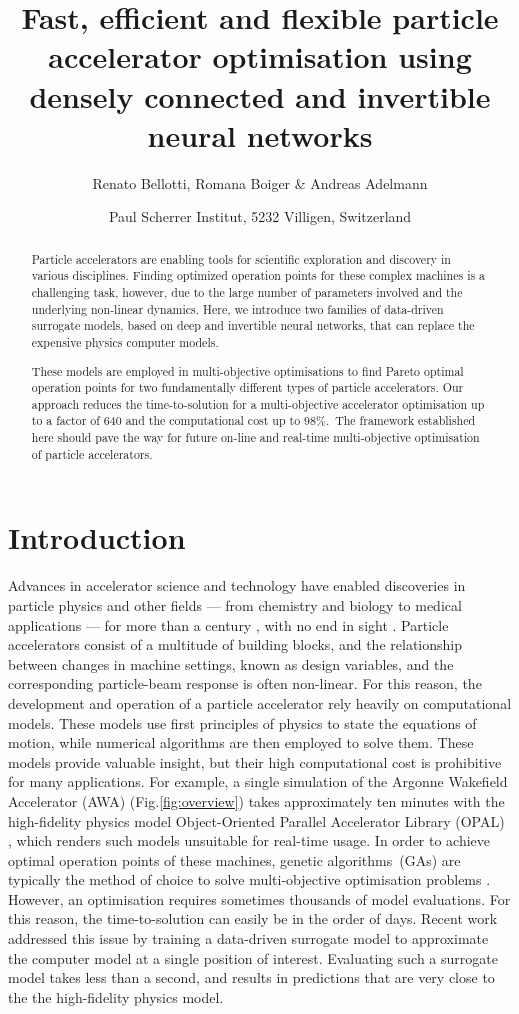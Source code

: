 \documentclass[a4paper, 12pt, version-1-compatibility]{article}
\title{Fast,  efficient  and  flexible  particle  accelerator  optimisation using densely connected and invertible neural networks}
\author{Renato Bellotti, Romana Boiger \& Andreas Adelmann}
\date{Paul Scherrer Institut, 5232 Villigen, Switzerland}
\def\gas{genetic algorithms}
\def\opal{OPAL}
\def\dvars{design variables}
\newcommand{\figref}[1]{Fig.\xspace\ref{#1}}
\begin{document}
\maketitle
\begin{abstract}
\noindent Particle accelerators are enabling tools for scientific exploration and discovery in various disciplines. 
Finding optimized operation points for these complex machines is a challenging task, however, due to the large number of parameters involved and the underlying non-linear dynamics. Here, we introduce two families of data-driven surrogate models, based on deep and invertible neural networks, that can replace the expensive physics computer models. 

These models are employed in multi-objective optimisations to find Pareto optimal operation points for two fundamentally different types of particle accelerators. Our approach reduces the time-to-solution for a multi-objective accelerator optimisation up to a factor of $640$ and the computational cost up to $98\%$.\ The framework established here should pave the way for future on-line and real-time multi-objective optimisation of particle accelerators.
\end{abstract}


\section*{Introduction}
Advances in accelerator science and technology have enabled discoveries in particle physics and other fields --- from chemistry and biology to medical applications --- for more than a century \cite{accel-phys-tod-2020}, with no end in sight \cite{no-front}.
Particle accelerators consist of a multitude of building blocks, and the relationship between changes in machine settings, known as \dvars, and the corresponding particle-beam response is often non-linear. For this reason, the development and operation of a particle accelerator rely heavily on computational models. These models use first principles of physics to state the equations of motion, while numerical algorithms are then employed to solve them. These models provide valuable insight, but their high computational cost is prohibitive for many applications. For example, a single simulation of the Argonne Wakefield Accelerator (AWA) (\figref{fig:overview}) takes approximately ten minutes with the high-fidelity physics model Object-Oriented Parallel Accelerator Library (\opal) \cite{opal}, which renders such models unsuitable for real-time usage. In order to achieve optimal operation points of these machines,  \gas\ (GAs) are typically the method of choice to solve multi-objective optimisation problems \cite{PhysRevAccelBeams.20.033401, PhysRevAccelBeams.22.054602, PhysRevAccelBeams.22.064602, PhysRevAccelBeams.22.122001}. However, an optimisation requires sometimes thousands of model evaluations. For this reason, the time-to-solution can easily be in the order of days. 
Recent work~\cite{ml_speedup} addressed this issue by training a data-driven surrogate model to approximate the computer model at a single position of interest. Evaluating such a surrogate model takes less than a second, and results in predictions that are very close to the the high-fidelity physics model. 
\end{document}
